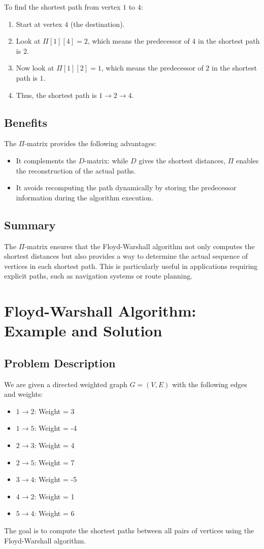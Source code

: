 To find the shortest path from vertex \( 1 \) to \( 4 \):
\begin{enumerate}
    \item Start at vertex \( 4 \) (the destination).
    \item Look at \( \Pi[1][4] = 2 \), which means the predecessor of \( 4 \) in the shortest path is \( 2 \).
    \item Now look at \( \Pi[1][2] = 1 \), which means the predecessor of \( 2 \) in the shortest path is \( 1 \).
    \item Thus, the shortest path is \( 1 \to 2 \to 4 \).
\end{enumerate}

\subsection{Benefits}
The \( \Pi \)-matrix provides the following advantages:
\begin{itemize}
    \item It complements the \( D \)-matrix: while \( D \) gives the shortest distances, \( \Pi \) enables the reconstruction of the actual paths.
    \item It avoids recomputing the path dynamically by storing the predecessor information during the algorithm execution.
\end{itemize}

\subsection{Summary}
The \( \Pi \)-matrix ensures that the Floyd-Warshall algorithm not only computes the shortest distances but also provides a way to determine the actual sequence of vertices in each shortest path. This is particularly useful in applications requiring explicit paths, such as navigation systems or route planning.


\section{Floyd-Warshall Algorithm: Example and Solution}

\subsection{Problem Description}
We are given a directed weighted graph \( G = (V, E) \) with the following edges and weights:
\begin{itemize}
    \item \( 1 \to 2 \): Weight = 3
    \item \( 1 \to 5 \): Weight = -4
    \item \( 2 \to 3 \): Weight = 4
    \item \( 2 \to 5 \): Weight = 7
    \item \( 3 \to 4 \): Weight = -5
    \item \( 4 \to 2 \): Weight = 1
    \item \( 5 \to 4 \): Weight = 6
\end{itemize}
The goal is to compute the shortest paths between all pairs of vertices using the Floyd-Warshall algorithm.

